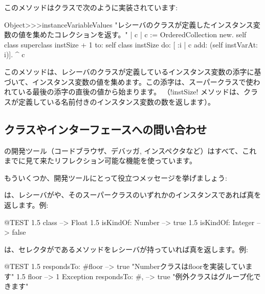 \documentclass[a4paper,10pt,twoside]{book}
\begin{document}
このメソッドはクラスで次のように実装されています:
\begin{code}{}
Object>>>instanceVariableValues
	"レシーバのクラスが定義したインスタンス変数の値を集めたコレクションを返す。"	
	| c |
	c := OrderedCollection new.
	self class superclass instSize + 1
		to: self class instSize
		do: [ :i | c add: (self instVarAt: i)].
	^ c
\end{code}

このメソッドは、レシーバのクラスが定義しているインスタンス変数の添字に基づいて、インスタンス変数の値を集めます。この添字は、スーパークラスで使われている最後の添字の直後の値から始まります。
（\ct!instSize! メソッドは、クラスが定義している名前付きのインスタンス変数の数を返します）。

\subsection{クラスやインターフェースへの問い合わせ}

\pharo の開発ツール（コードブラウザ、デバッガ, インスペクタなど）はすべて、これまでに見て来たリフレクション可能な機能を使っています。

もういくつか、開発ツールにとって役立つメッセージを挙げましょう:

は、レシーバがや、そのスーパークラスのいずれかのインスタンスであれば真を返します。例:

\begin{code}{@TEST}
1.5 class                     --> Float
1.5 isKindOf: Number --> true
1.5 isKindOf: Integer   --> false
\end{code}

は、セレクタがであるメソッドをレシーバが持っていれば真を返します。例:

\begin{code}{@TEST}
1.5 respondsTo: #floor      --> true    "Numberクラスはfloorを実装しています"
1.5 floor                            --> 1
Exception respondsTo: #, --> true    "例外クラスはグループ化できます"
\end{code}

\end{document}
